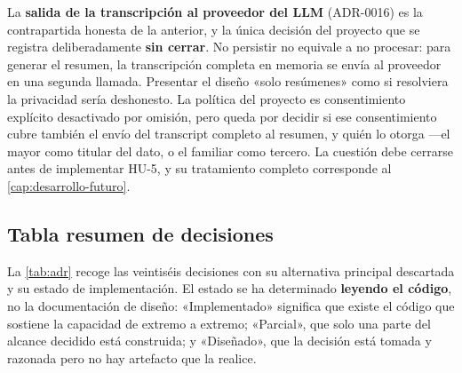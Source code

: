 La \textbf{salida de la transcripción al proveedor del LLM} (ADR-0016) es la contrapartida honesta de la
anterior, y la única decisión del proyecto que se registra deliberadamente \textbf{sin cerrar}. No
persistir no equivale a no procesar: para generar el resumen, la transcripción completa en memoria se envía
al proveedor en una segunda llamada. Presentar el diseño «solo resúmenes» como si resolviera la privacidad
sería deshonesto. La política del proyecto es consentimiento explícito desactivado por omisión, pero queda
por decidir si ese consentimiento cubre también el envío del transcript completo al resumen, y quién lo
otorga ---el mayor como titular del dato, o el familiar como tercero. La cuestión debe cerrarse antes de
implementar HU-5, y su tratamiento completo corresponde al \autoref{cap:desarrollo-futuro}.

\subsection{Tabla resumen de decisiones}

La \autoref{tab:adr} recoge las veintiséis decisiones con su alternativa principal descartada y su estado de
implementación. El estado se ha determinado \textbf{leyendo el código}, no la documentación de diseño:
«Implementado» significa que existe el código que sostiene la capacidad de extremo a extremo; «Parcial»,
que solo una parte del alcance decidido está construida; y «Diseñado», que la decisión está tomada y
razonada pero no hay artefacto que la realice.

